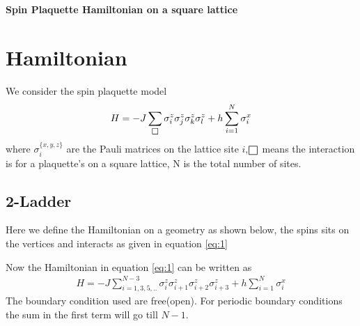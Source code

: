 \documentclass[a4paper]{extarticle}
\def\msquare{\mathord{\scalerel*{\Box}{gX}}}
\begin{document}
\begin{titlepage}
\newcommand{\HRule}{\rule{\linewidth}{0.5mm}} 

\center

{ \huge \bfseries Spin Plaquette Hamiltonian on a square lattice}\\[0.4cm] 

\vfill

\end{titlepage}


\tableofcontents
\newpage
\listoffigures

\newpage
\section{Hamiltonian}
We consider the spin plaquette model
\begin{eqnarray} \label{eq:1}
H = -J\sum_{\msquare} {\sigma_i^z \sigma_{j}^z \sigma_k^z \sigma_{l}^z} + h\sum_{i=1}^{N} \sigma_i^x
\end{eqnarray}
where $\sigma_i^{\{x,y,z\}}$ are the Pauli matrices on the lattice site $i$,$\msquare$ means the interaction is for a plaquette's on a square lattice, N is the total number of sites.

\subsection{2-Ladder}
Here we define the Hamiltonian on a geometry as shown below, the spins sits on the vertices and interacts as given in equation \ref{eq:1}
\vspace{5mm}


Now the Hamiltonian in equation \ref{eq:1} can be written as
\begin{eqnarray} \label{eq:2}
H = -J\sum_{i=1,3,5,..}^{N-3} {\sigma_i^z \sigma_{i+1}^z \sigma_{i+2}^z \sigma_{i+3}^z} + h\sum_{i=1}^{N} \sigma_i^x
\end{eqnarray}
The boundary condition used are free(open). For periodic boundary conditions the sum in the first term will go till $N-1$.
\end{document}
